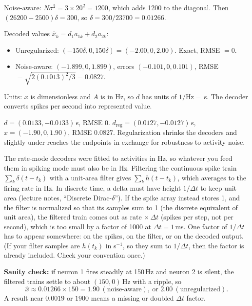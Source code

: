 \documentclass[10pt,letterpaper]{article}
\newcommand{\ans}[1]{\par\vspace{3pt}{\bfseries #1}\quad}
\begin{document}
Noise-aware: $N\sigma^2 = 3 \times 20^2 = 1200$, which adds 1200 to the diagonal. Then $(26200 - 2500)\delta = 300$, so $\delta = 300/23700 = 0.01266$.

Decoded values $\hat x_k = d_1 a_{1k} + d_2 a_{2k}$:
\begin{itemize}[leftmargin=1.5em,itemsep=1pt]
\item Unregularized: $(-150\delta, 0, 150\delta) = (-2.00, 0, 2.00)$. Exact, RMSE $= 0$.
\item Noise-aware: $(-1.899, 0, 1.899)$, errors $(-0.101, 0, 0.101)$, RMSE $= \sqrt{2(0.1013)^2/3} = 0.0827$.
\end{itemize}
Units: $x$ is dimensionless and $A$ is in Hz, so $d$ has units of $1/\mathrm{Hz} = $\,s. The decoder converts spikes per second into represented value.
\begin{result}
$d = (0.0133, -0.0133)$\,s, RMSE $0$. \quad $d_{\mathrm{reg}} = (0.0127, -0.0127)$\,s, $\hat x = (-1.90, 0, 1.90)$, RMSE $0.0827$. Regularization shrinks the decoders and slightly under-reaches the endpoints in exchange for robustness to activity noise.
\end{result}

\ans{6c.}
The rate-mode decoders were fitted to activities in Hz, so whatever you feed them in spiking mode must also be in Hz. Filtering the continuous spike train $\sum_k\delta(t - t_k)$ with a unit-area filter gives $\sum_k h(t - t_k)$, which averages to the firing rate in Hz. In discrete time, a delta must have height $1/\Delta t$ to keep unit area (lecture notes, ``Discrete Dirac-$\delta$''). If the spike array instead stores 1, and the filter is normalized so that its samples sum to 1 (the discrete equivalent of unit area), the filtered train comes out as rate $\times\,\Delta t$ (spikes per step, not per second), which is too small by a factor of 1000 at $\Delta t = 1$\,ms. One factor of $1/\Delta t$ has to appear somewhere: on the spikes, on the filter, or on the decoded output. (If your filter samples are $h(t_k)$ in s$^{-1}$, so they sum to $1/\Delta t$, then the factor is already included. Check your convention once.)

\textbf{Sanity check:} if neuron 1 fires steadily at 150\,Hz and neuron 2 is silent, the filtered trains settle to about $(150, 0)$\,Hz with a ripple, so
\[
\hat x \approx 0.01266 \times 150 = 1.90\ (\text{noise-aware}),\ \text{or } 2.00\ (\text{unregularized}).
\]
A result near $0.0019$ or $1900$ means a missing or doubled $\Delta t$ factor.
\end{document}
